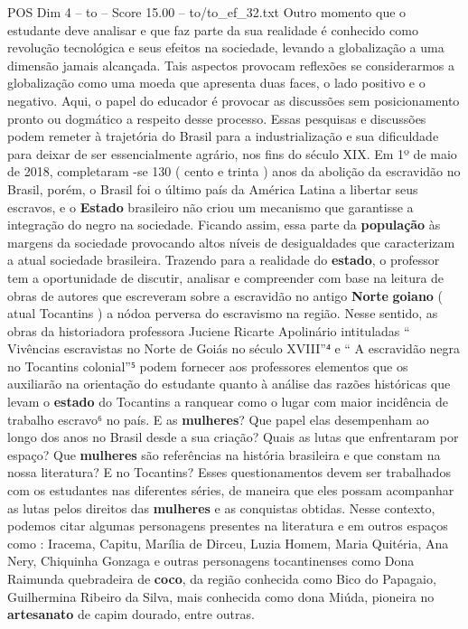 \begin{textsample}{POS Dim 4 – to – Score 15.00 – to/to\_ef\_32.txt}
Outro momento que o estudante deve analisar e que faz parte da sua realidade é conhecido como revolução tecnológica e seus efeitos na sociedade, levando a globalização a uma dimensão jamais alcançada.
Tais aspectos provocam reflexões se considerarmos a globalização como uma moeda que apresenta duas faces, o lado positivo e o negativo.
Aqui, o papel do educador é provocar as discussões sem posicionamento pronto ou dogmático a respeito desse processo.
Essas pesquisas e discussões podem remeter à trajetória do Brasil para a industrialização e sua dificuldade para deixar de ser essencialmente agrário, nos fins do século XIX.
Em 1º de maio de 2018, completaram -se 130 ( cento e trinta ) anos da abolição da escravidão no Brasil, porém, o Brasil foi o último país da América Latina a libertar seus escravos, e o \textbf{Estado} brasileiro não criou um mecanismo que garantisse a integração do negro na sociedade.
Ficando assim, essa parte da \textbf{população} às margens da sociedade provocando altos níveis de desigualdades que caracterizam a atual sociedade brasileira.
Trazendo para a realidade do \textbf{estado}, o professor tem a oportunidade de discutir, analisar e compreender com base na leitura de obras de autores que escreveram sobre a escravidão no antigo \textbf{Norte} \textbf{goiano} ( atual Tocantins ) a nódoa perversa do escravismo na região.
Nesse sentido, as obras da historiadora professora Juciene Ricarte Apolinário intituladas “ Vivências escravistas no Norte de Goiás no século XVIII”⁴ e “ A escravidão negra no Tocantins colonial”⁵ podem fornecer aos professores elementos que os auxiliarão na orientação do estudante quanto à análise das razões históricas que levam o \textbf{estado} do Tocantins a ranquear como o lugar com maior incidência de trabalho escravo⁶ no país.
E as \textbf{mulheres}?
Que papel elas desempenham ao longo dos anos no Brasil desde a sua criação?
Quais as lutas que enfrentaram por espaço?
Que \textbf{mulheres} são referências na história brasileira e que constam na nossa literatura?
E no Tocantins?
Esses questionamentos devem ser trabalhados com os estudantes nas diferentes séries, de maneira que eles possam acompanhar as lutas pelos direitos das \textbf{mulheres} e as conquistas obtidas.
Nesse contexto, podemos citar algumas personagens presentes na literatura e em outros espaços como : Iracema, Capitu, Marília de Dirceu, Luzia Homem, Maria Quitéria, Ana Nery, Chiquinha Gonzaga e outras personagens tocantinenses como Dona Raimunda quebradeira de \textbf{coco}, da região conhecida como Bico do Papagaio, Guilhermina Ribeiro da Silva, mais conhecida como dona Miúda, pioneira no \textbf{artesanato} de capim dourado, entre outras.

\end{textsample}
